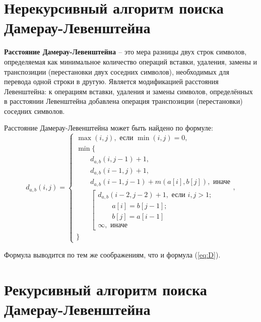 \section{Нерекурсивный алгоритм поиска \\Дамерау-Левенштейна}

\textbf{Расстояние Дамерау-Левенштейна \cite{Dameray_Levenshtein}} -- это мера разницы двух строк символов, определяемая как минимальное количество операций вставки, удаления, замены и транспозиции (перестановки двух соседних символов), необходимых для перевода одной строки в другую. Является модификацией расстояния Левенштейна: к операциям вставки, удаления и замены символов, определённых в расстоянии Левенштейна добавлена операция транспозиции (перестановки) соседних символов.

Расстояние Дамерау-Левенштейна может быть найдено по формуле:
\begin{equation}
	\label{eq:a}
	d_{a,b}(i, j) = \begin{cases}
		\max(i, j), \text{ если }\min(i, j) = 0,\\
		\min \lbrace \\
			\qquad d_{a,b}(i, j-1) + 1,\\
			\qquad d_{a,b}(i-1, j) + 1,\\
			\qquad d_{a,b}(i-1, j-1) + m(a[i], b[j]), \text{ иначе}\\
			\qquad \left[ \begin{array}{cc}d_{a,b}(i-2, j-2) + 1, \text{ если }i,j > 1;\\
			\qquad \text{}a[i] = b[j-1]; \\
			\qquad \text{}b[j] = a[i-1]\\
			\infty, \text{ иначе}\end{array}\right.\\
		\rbrace
		\end{cases},
\end{equation}

Формула выводится по тем же соображениям, что и формула (\ref{eq:D}).

\section{Рекурсивный алгоритм поиска \\Дамерау-Левенштейна}
\label{sec:recmat}

